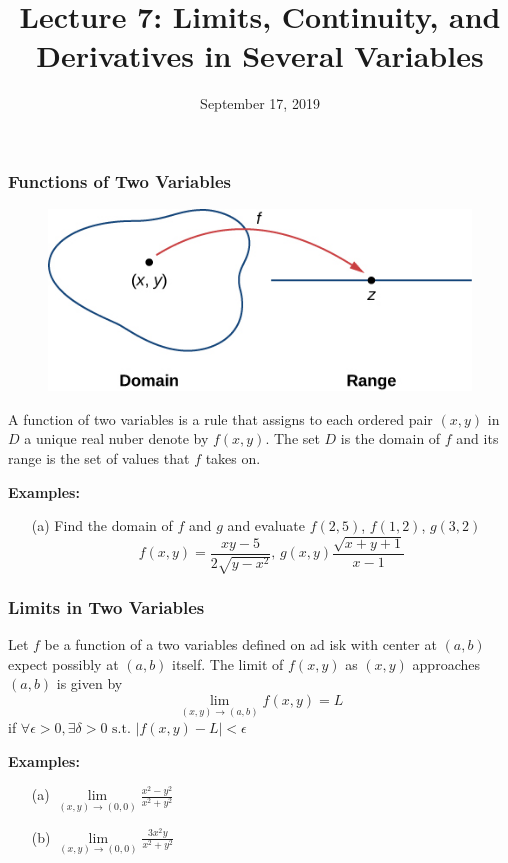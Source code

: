 \documentclass{beamer}
\title{Lecture 7: Limits, Continuity, and Derivatives in Several Variables}
\date{September 17, 2019}
\begin{document}
	
\frame{\titlepage}


\begin{frame}
\frametitle{Functions of Two Variables}
\begin{figure}
	\centering
	\includegraphics[height=.25\textheight]{function_map.jpg}\\
	\hspace*{10pt}\hbox{}
\end{figure}

A function of two variables is a rule that assigns to each ordered pair $(x,y)$ in $D$ a unique real nuber denote by $f(x,y)$. The set $D$ is the domain of $f$ and its range is the set of values that $f$ takes on.

\vspace{6pt}
\textbf{Examples:}
\begin{itemize}
	\item[(a)] Find the domain of $f$ and $g$ and evaluate $f(2,5)$, $f(1,2)$, $g(3,2)$
	$$f(x,y) = \frac{xy-5}{2 \sqrt{y-x^2}}, \, g(x,y) \frac{\sqrt{x+y+1}}{x-1}$$
\end{itemize}
\end{frame}


\begin{frame}
\frametitle{Limits in Two Variables}
Let $f$ be a function of a two variables defined on ad isk with center at $(a,b)$ expect possibly at $(a,b)$ itself. The limit of $f(x,y)$ as $(x,y)$ approaches $(a,b)$ is given by 
$$\lim\limits_{(x,y) \to (a,b)} f(x,y) = L$$
 if $\forall \epsilon > 0, \exists \delta > 0 \mbox{ s.t. } |f(x,y) - L| < \epsilon$
 
\vspace{12pt}
\textbf{Examples:}
\begin{itemize}
	\item[(a)] $\lim\limits_{(x,y) \to (0,0)} \frac{x^2-y^2}{x^2 + y^2}$
	\item[(b)] $\lim\limits_{(x,y) \to (0,0)} \frac{3x^2y}{x^2+y^2}$
\end{itemize}
\end{frame}
\end{document}
